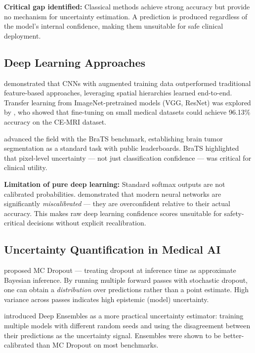 \documentclass[12pt,a4paper]{article}
\begin{document}
\textbf{Critical gap identified:} Classical methods achieve strong accuracy but provide no mechanism for uncertainty estimation. A prediction is produced regardless of the model's internal confidence, making them unsuitable for safe clinical deployment.

\subsection{Deep Learning Approaches}

\citet{cheng2015enhanced} demonstrated that CNNs with augmented training data outperformed traditional feature-based approaches, leveraging spatial hierarchies learned end-to-end. Transfer learning from ImageNet-pretrained models (VGG, ResNet) was explored by \citet{sultan2019multi}, who showed that fine-tuning on small medical datasets could achieve 96.13\% accuracy on the CE-MRI dataset.

\citet{bakas2018identifying} advanced the field with the BraTS benchmark, establishing brain tumor segmentation as a standard task with public leaderboards. BraTS highlighted that pixel-level uncertainty — not just classification confidence — was critical for clinical utility.

\textbf{Limitation of pure deep learning:} Standard softmax outputs are not calibrated probabilities. \citet{guo2017calibration} demonstrated that modern neural networks are significantly \textit{miscalibrated} — they are overconfident relative to their actual accuracy. This makes raw deep learning confidence scores unsuitable for safety-critical decisions without explicit recalibration.

\subsection{Uncertainty Quantification in Medical AI}

\citet{gal2016dropout} proposed MC Dropout — treating dropout at inference time as approximate Bayesian inference. By running multiple forward passes with stochastic dropout, one can obtain a \textit{distribution} over predictions rather than a point estimate. High variance across passes indicates high epistemic (model) uncertainty.

\citet{lakshminarayanan2017simple} introduced Deep Ensembles as a more practical uncertainty estimator: training multiple models with different random seeds and using the disagreement between their predictions as the uncertainty signal. Ensembles were shown to be better-calibrated than MC Dropout on most benchmarks.
\end{document}
